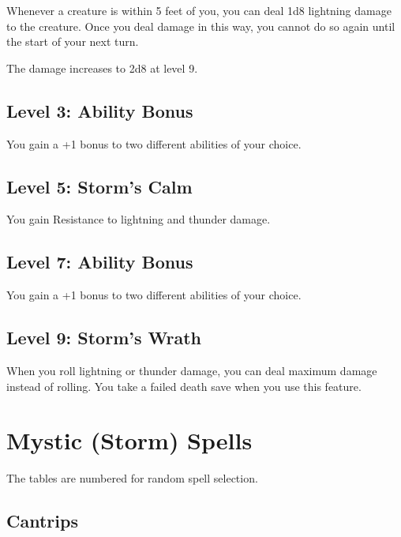 \documentclass[12pt,letterpaper,twocolumn,openany,nodeprecatedcode,bg=none]{dndbook}
\let\oldsubsection\subsection
\renewcommand{\subsection}[1]{%
  \needspace{5\baselineskip}%
  \oldsubsection{#1}%
}
\begin{document}
Whenever a creature is within 5 feet of you, you can deal 1d8 lightning
damage to the creature. Once you deal damage in this way, you cannot do
so again until the start of your next turn.

The damage increases to 2d8 at level 9.

\subsection{Level 3: Ability Bonus}\label{level-3-ability-bonus}

You gain a +1 bonus to two different abilities of your choice.

\subsection{Level 5: Storm's Calm}\label{level-5-storms-calm}

You gain Resistance to lightning and thunder damage.

\subsection{Level 7: Ability Bonus}\label{level-7-ability-bonus}

You gain a +1 bonus to two different abilities of your choice.

\subsection{Level 9: Storm's Wrath}\label{level-9-storms-wrath}

When you roll lightning or thunder damage, you can deal maximum damage
instead of rolling. You take a failed death save when you use this
feature.

\section{Mystic (Storm) Spells}\label{mystic-storm-spells}

The tables are numbered for random spell selection.

\subsection{Cantrips}\label{cantrips}

\end{document}
